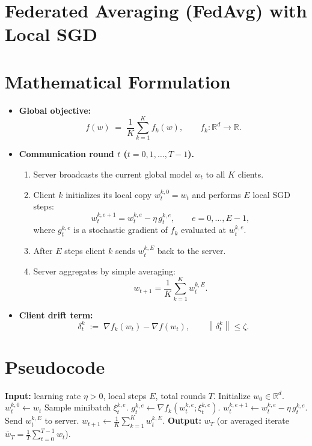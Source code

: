 \documentclass{article}
\newcommand{\norm}[1]{\left\|#1\right\|}
\begin{document}
\section*{Federated Averaging (FedAvg) with Local SGD}

\section*{Mathematical Formulation}
\begin{itemize}
    \item \textbf{Global objective:}
    \[
        f(w)\;=\;\frac{1}{K}\sum_{k=1}^{K} f_k(w),\qquad 
        f_k:\mathbb{R}^d\rightarrow\mathbb{R}.
    \]
    \item \textbf{Communication round $t$ ($t=0,1,\dots,T-1$).}
    \begin{enumerate}
        \item Server broadcasts the current global model $w_t$ to all $K$ clients.
        \item Client $k$ initializes its local copy $w_{t}^{k,0}=w_t$ and performs $E$ local SGD steps:
        \[
            w_{t}^{k,e+1}=w_{t}^{k,e}-\eta\, g_{t}^{k,e},
            \qquad e=0,\dots ,E-1,
        \]
        where $g_{t}^{k,e}$ is a stochastic gradient of $f_k$ evaluated at $w_{t}^{k,e}$.
        \item After $E$ steps client $k$ sends $w_{t}^{k,E}$ back to the server.
        \item Server aggregates by simple averaging:
        \[
            w_{t+1}= \frac{1}{K}\sum_{k=1}^{K} w_{t}^{k,E}.
        \]
    \end{enumerate}
    \item \textbf{Client drift term:}
    \[
        \delta_{t}^{k}\;:=\;\nabla f_k(w_t)-\nabla f(w_t),\qquad 
        \norm{\delta_{t}^{k}}\le \zeta .
    \]
\end{itemize}

\section*{Pseudocode}
\begin{algorithm}[H]
\caption{FedAvg with $K$ clients, $E$ local steps}
\begin{algorithmic}[1]
\STATE \textbf{Input:} learning rate $\eta>0$, local steps $E$, total rounds $T$.
\STATE Initialize $w_0\in\mathbb{R}^d$.
        \STATE $w_{t}^{k,0}\gets w_t$
            \STATE Sample minibatch $\xi_{t}^{k,e}$.
            \STATE $g_{t}^{k,e}\gets \nabla f_k(w_{t}^{k,e};\xi_{t}^{k,e})$.
            \STATE $w_{t}^{k,e+1}\gets w_{t}^{k,e}-\eta\, g_{t}^{k,e}$.
        \ENDFOR
        \STATE Send $w_{t}^{k,E}$ to server.
    \ENDFOR
    \STATE $w_{t+1}\gets \frac{1}{K}\sum_{k=1}^{K} w_{t}^{k,E}$.
\ENDFOR
\STATE \textbf{Output:} $w_T$ (or averaged iterate $\bar w_T=\frac1T\sum_{t=0}^{T-1}w_t$).
\end{algorithmic}
\end{algorithm}
\end{document}
